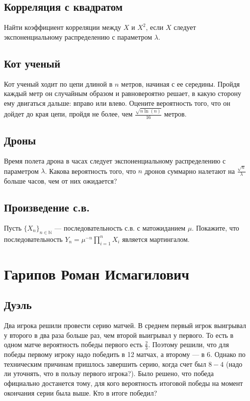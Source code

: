 \documentclass[12pt]{article}
\newcommand\N{\mathbb{N}}
\begin{document}
\subsection{Корреляция с квадратом}

Найти коэффициент корреляции между $X$ и $X^2$, если $X$ следует экспоненциальному распределению с параметром $\lambda$.



\subsection{Кот ученый}

Кот ученый ходит по цепи длиной в $n$ метров, начиная с ее середины. Пройдя каждый метр он случайным образом и равновероятно решает, в какую сторону ему двигаться дальше: вправо или влево. Оцените вероятность того, что он дойдет до края цепи, пройдя не более, чем $\frac{\sqrt{n \ln(n)}}{16}$ метров.



\subsection{Дроны}

Время полета дрона в часах следует экспоненциальному распределению с параметром $\lambda$. Какова вероятность того, что $n$ дронов суммарно налетают на $\frac{\sqrt{n}}{\lambda}$ больше часов, чем от них ожидается?



\subsection{Произведение с.в.}

Пусть $\{X_n\}_{n \in \N}$ --- последовательность с.в. с матожиданием $\mu$. Покажите, что последовательность $Y_n = \mu^{-n} \prod_{i = 1}^n X_i$ является мартингалом.



\newpage
\section{Гарипов Роман Исмагилович}

\subsection{Дуэль}

Два игрока решили провести серию матчей. В среднем первый игрок выигрывал у второго в два раза больше раз, чем второй выигрывал у первого. То есть в одном матче вероятность победы первого есть $\frac{2}{3}$. Поэтому решили, что для победы первому игроку надо победить в 12 матчах, а второму --- в 6. Однако по техническим причинам пришлось завершить серию, когда счет был $8-4$ (надо ли уточнять, что в пользу первого игрока?). Было решено, что победа официально достанется тому, для кого вероятность итоговой победы на момент окончания серии была выше. Кто в итоге победил?
\end{document}
